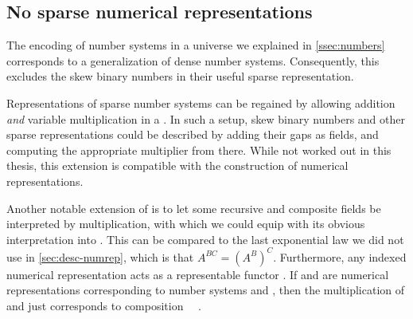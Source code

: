 \subsection{No sparse numerical representations}\label{sec:discussion-no-sparse}
The encoding of number systems in a universe we explained in \autoref{ssec:numbers} corresponds to a generalization of dense number systems. Consequently, this excludes the skew binary numbers \cite{oka95b} in their useful sparse representation.

Representations of sparse number systems can be regained by allowing addition \emph{and} variable multiplication in a . In such a setup, skew binary numbers and other sparse representations could be described by adding their gaps as fields, and computing the appropriate multiplier from there. While not worked out in this thesis, this extension is compatible with the construction of numerical representations.

Another notable extension of  is to let some recursive and composite fields be interpreted by multiplication, with which we could equip  with its obvious interpretation into \bN{}. This can be compared to the last exponential law we did not use in \autoref{sec:desc-numrep}, which is that $A^{BC} = (A^B)^C$. Furthermore, any indexed numerical representation acts as a representable functor . If  and  are numerical representations corresponding to number systems  and , then the multiplication of  and  just corresponds to composition \ \ .
